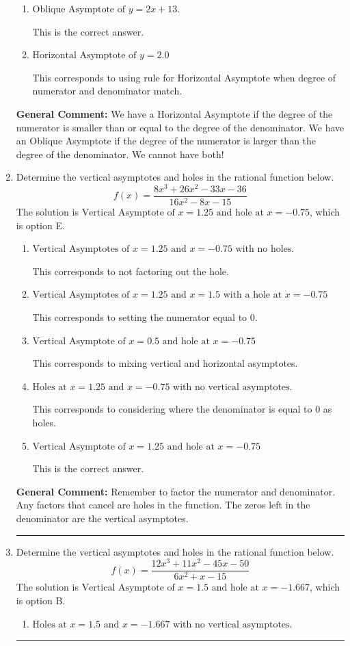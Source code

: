 \documentclass{extbook}[14pt]
\newcommand{\litem}[1]{\item #1

\rule{\textwidth}{0.4pt}}
\begin{document}
\begin{enumerate}
{\begin{enumerate}[label=\Alph*.]
This corresponds to considering where the denominator is equal to 0 as horizontal asymptote.
\item \( \text{Oblique Asymptote of } y = 2x + 13. \)

This is the correct answer.
\item \( \text{Horizontal Asymptote of } y = 2.0  \)

This corresponds to using rule for Horizontal Asymptote when degree of numerator and denominator match.
\end{enumerate}

\textbf{General Comment:} We have a Horizontal Asymptote if the degree of the numerator is smaller than or equal to the degree of the denominator. We have an Oblique Asymptote if the degree of the numerator is larger than the degree of the denominator. We cannot have both!
}
\litem{
Determine the vertical asymptotes and holes in the rational function below.
\[ f(x) = \frac{8x^{3} +26 x^{2} -33 x -36}{16x^{2} -8 x -15} \]The solution is \( \text{Vertical Asymptote of } x = 1.25 \text{ and hole at } x = -0.75 \), which is option E.\begin{enumerate}[label=\Alph*.]
\item \( \text{Vertical Asymptotes of } x = 1.25 \text{ and } x = -0.75 \text{ with no holes.} \)

This corresponds to not factoring out the hole.
\item \( \text{Vertical Asymptotes of } x = 1.25 \text{ and } x = 1.5 \text{ with a hole at } x = -0.75 \)

This corresponds to setting the numerator equal to 0.
\item \( \text{Vertical Asymptote of } x = 0.5 \text{ and hole at } x = -0.75 \)

This corresponds to mixing vertical and horizontal asymptotes.
\item \( \text{Holes at } x = 1.25 \text{ and } x = -0.75 \text{ with no vertical asymptotes.} \)

This corresponds to considering where the denominator is equal to 0 as holes.
\item \( \text{Vertical Asymptote of } x = 1.25 \text{ and hole at } x = -0.75 \)

This is the correct answer.
\end{enumerate}

\textbf{General Comment:} Remember to factor the numerator and denominator. Any factors that cancel are holes in the function. The zeros left in the denominator are the vertical asymptotes.
}
\litem{
Determine the vertical asymptotes and holes in the rational function below.
\[ f(x) = \frac{12x^{3} +11 x^{2} -45 x -50}{6x^{2} +x -15} \]The solution is \( \text{Vertical Asymptote of } x = 1.5 \text{ and hole at } x = -1.667 \), which is option B.\begin{enumerate}[label=\Alph*.]
\item \( \text{Holes at } x = 1.5 \text{ and } x = -1.667 \text{ with no vertical asymptotes.} \)


\end{enumerate}}
\end{enumerate}
\end{document}
